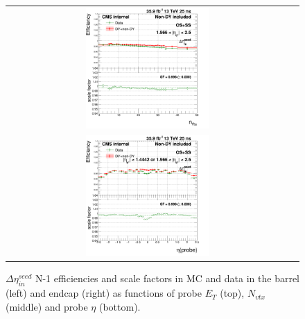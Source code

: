 \begin{figure}[bh]
\begin{center}
\begin{tabular}{cc}
      \includegraphics[width=0.45\textwidth]{figures/Zprime/2016/ScaleFactor/SameSign/N_1_eff/g_compare_cut_nVtx_Endcap_ea_ta_inc_AS_N_1_DEtaIn_PUW.png} \\
      \includegraphics[width=0.45\textwidth]{figures/Zprime/2016/ScaleFactor/SameSign/N_1_eff/g_compare_cut_eta_Barrel+Endcap_ea_ta_inc_AS_N_1_DEtaIn_PUW.png}
    \end{tabular}
    \caption{$\Delta \eta_{in}^{seed}$ N-1 efficiencies and scale factors in MC and data in the barrel (left) and endcap (right) as functions of probe $E_T$ (top), $N_{vtx}$ (middle) and probe $\eta$ (bottom).}
    \label{fig:DEtaIn_2016}
  \end{center}
\end{figure}

